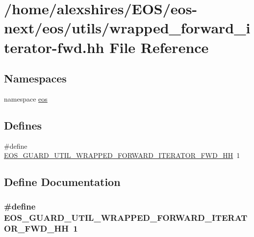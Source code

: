 \hypertarget{wrapped__forward__iterator-fwd_8hh}{
\section{/home/alexshires/EOS/eos-\/next/eos/utils/wrapped\_\-forward\_\-iterator-\/fwd.hh File Reference}
\label{wrapped__forward__iterator-fwd_8hh}
}
\subsection*{Namespaces}
\begin{DoxyCompactItemize}
\item 
namespace \hyperlink{namespaceeos}{eos}
\end{DoxyCompactItemize}
\subsection*{Defines}
\begin{DoxyCompactItemize}
\item 
\#define \hyperlink{wrapped__forward__iterator-fwd_8hh_a6e3b5fb31d97c92444c90ca23acabf54}{EOS\_\-GUARD\_\-UTIL\_\-WRAPPED\_\-FORWARD\_\-ITERATOR\_\-FWD\_\-HH}~1
\end{DoxyCompactItemize}


\subsection{Define Documentation}
\hypertarget{wrapped__forward__iterator-fwd_8hh_a6e3b5fb31d97c92444c90ca23acabf54}{
\subsubsection[{EOS\_\-GUARD\_\-UTIL\_\-WRAPPED\_\-FORWARD\_\-ITERATOR\_\-FWD\_\-HH}]{\setlength{\rightskip}{0pt plus 5cm}\#define EOS\_\-GUARD\_\-UTIL\_\-WRAPPED\_\-FORWARD\_\-ITERATOR\_\-FWD\_\-HH~1}}
\label{wrapped__forward__iterator-fwd_8hh_a6e3b5fb31d97c92444c90ca23acabf54}
